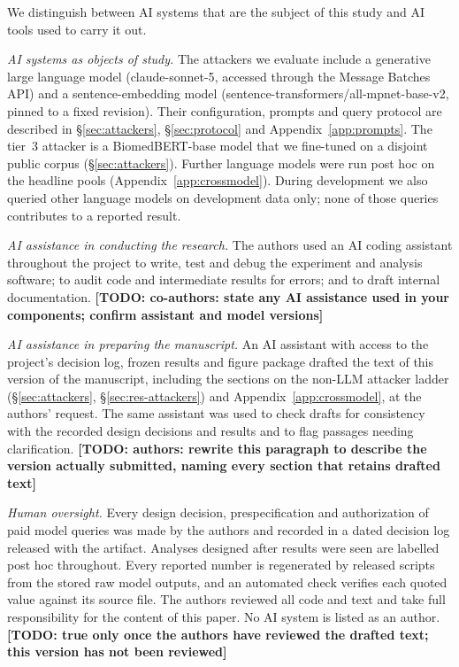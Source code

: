 \documentclass[sigconf,review]{acmart}
\newcommand{\sonnet}{\textsf{claude-sonnet-5}}
\newcommand{\TODO}[1]{\textbf{[TODO: #1]}}
\begin{document}
\begin{ai}
We distinguish between AI systems that are the subject of this study and AI
tools used to carry it out.

\emph{AI systems as objects of study.} The attackers we evaluate include a
generative large language model (\sonnet, accessed through the Message Batches
API) and a sentence-embedding model
(\textsf{sentence-transformers/all-mpnet-base-v2}, pinned to a fixed revision).
Their configuration, prompts and query protocol are described in
\S\ref{sec:attackers}, \S\ref{sec:protocol} and Appendix~\ref{app:prompts}.
The tier~3 attacker is a \textsf{BiomedBERT-base} model that we fine-tuned on
a disjoint public corpus (\S\ref{sec:attackers}). Further language models were
run post hoc on the headline pools (Appendix~\ref{app:crossmodel}).
During development we also queried other language models on development data
only; none of those queries contributes to a reported result.

\emph{AI assistance in conducting the research.} The authors used an AI coding
assistant throughout the project to write, test and debug the experiment and
analysis software; to audit code and intermediate results for errors; and to
draft internal documentation. \TODO{co-authors: state any AI assistance used in
your components; confirm assistant and model versions}

\emph{AI assistance in preparing the manuscript.} An AI assistant with access
to the project's decision log, frozen results and figure package drafted the
text of this version of the manuscript, including the sections on the non-LLM
attacker ladder (\S\ref{sec:attackers}, \S\ref{sec:res-attackers}) and
Appendix~\ref{app:crossmodel}, at the authors' request. The same assistant was
used to check drafts for consistency with the recorded design decisions and
results and to flag passages needing clarification. \TODO{authors: rewrite this
paragraph to describe the version actually submitted, naming every section
that retains drafted text}

\emph{Human oversight.} Every design decision, prespecification and
authorization of paid model queries was made by the authors and recorded in a
dated decision log released with the artifact. Analyses designed after results
were seen are labelled post hoc throughout. Every reported number is
regenerated by released scripts from the stored raw model outputs, and an
automated check verifies each quoted value against its source file. The authors
reviewed all code and text and take full responsibility for the content of this
paper. No AI system is listed as an author. \TODO{true only once the authors
have reviewed the drafted text; this version has not been reviewed}
\end{ai}
\end{document}
